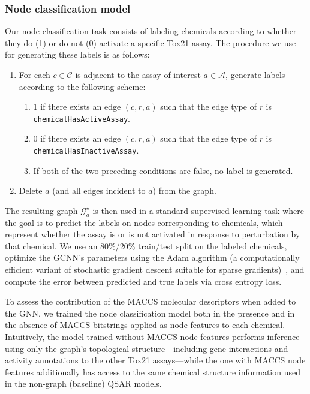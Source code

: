 \documentclass{ws-procs11x85}
\begin{document}
\subsubsection{Node classification model}\label{methods-nc}
Our node classification task consists of labeling chemicals according to whether they do (1) or do not (0) activate a specific Tox21 assay.
The procedure we use for generating these labels is as follows:
\begin{enumerate}
   \item For each $c \in \mathcal{C}$ is adjacent to the assay of interest $a \in \mathcal{A}$, generate labels according to the following scheme:
   \begin{enumerate}
      \item 1 if there exists an edge $(c, r, a)$ such that the edge type of $r$ is \texttt{chemicalHasActiveAssay}.
      \item 0 if there exists an edge $(c, r, a)$ such that the edge type of $r$ is \texttt{chemicalHasInactiveAssay}.
      \item If both of the two preceding conditions are false, no label is generated.
   \end{enumerate}
   \item Delete $a$ (and all edges incident to $a$) from the graph.
\end{enumerate}
The resulting graph $\mathcal{G}_a^\star$ is then used in a standard supervised learning task where the goal is to predict the labels on nodes corresponding to chemicals, which represent whether the assay is or is not activated in response to perturbation by that chemical.
We use an 80\%/20\% train/test split on the labeled chemicals, optimize the GCNN's parameters using the Adam algorithm (a computationally efficient variant of stochastic gradient descent suitable for sparse gradients)~\cite{kingma2014adam}, and compute the error between predicted and true labels via cross entropy loss.

To assess the contribution of the MACCS molecular descriptors when added to the GNN, we trained the node classification model both in the presence and in the absence of MACCS bitstrings applied as node features to each chemical.
Intuitively, the model trained without MACCS node features performs inference using only the graph's topological structure---including gene interactions and activity annotations to the other Tox21 assays---while the one with MACCS node features additionally has access to the same chemical structure information used in the non-graph (baseline) QSAR models.
\end{document}
